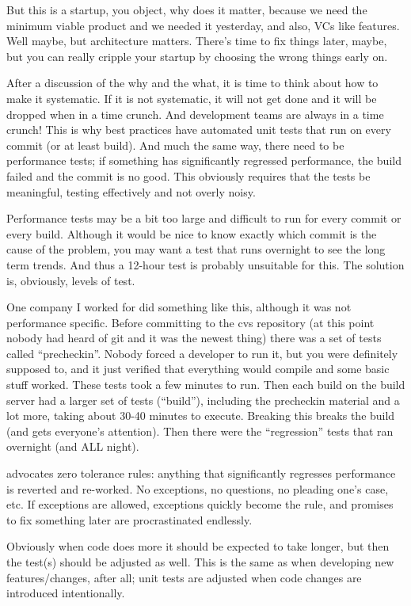 But this is a startup, you object, why does it matter, because we need the minimum viable product and we needed it yesterday, and also, VCs like features. Well maybe, but architecture matters. There's time to fix things later, maybe, but you can really cripple your startup by choosing the wrong things early on. 

After a discussion of the why and the what, it is time to think about how to make it systematic. If it is not systematic, it will not get done and it will be dropped when in a time crunch. And development teams are always in a time crunch! This is why best practices have automated unit tests that run on every commit (or at least build). And much the same way, there need to be performance tests; if something has significantly regressed performance, the build failed and the commit is no good. This obviously requires that the tests be meaningful, testing effectively and not overly noisy. 

Performance tests may be a bit too large and difficult to run for every commit or every build. Although it would be nice to know exactly which commit is the cause of the problem, you may want a test that runs overnight to see the long term trends. And thus a 12-hour test is probably unsuitable for this. The solution is, obviously, levels of test. 

One company I worked for did something like this, although it was not performance specific. Before committing to the cvs repository (at this point nobody had heard of git  and it was the newest thing) there was a set of tests called ``precheckin''. Nobody forced a developer to run it, but you were definitely supposed to, and it just verified that everything would compile and some basic stuff worked. These tests took a few minutes to run. Then each build on the build server had a larger set of tests (``build''), including the precheckin material and a lot more, taking about 30-40 minutes to execute. Breaking this breaks the build (and gets everyone's attention). Then there were the ``regression'' tests that ran overnight (and ALL night).

\cite{perfculture} advocates zero tolerance rules: anything that significantly regresses performance is reverted and re-worked. No exceptions, no questions, no pleading one's case, etc. If exceptions are allowed, exceptions quickly become the rule, and promises to fix something later are procrastinated endlessly.

Obviously when code does more it should be expected to take longer, but then the test(s) should be adjusted as well. This is the same as when developing new features/changes, after all; unit tests are adjusted when code changes are introduced intentionally.

